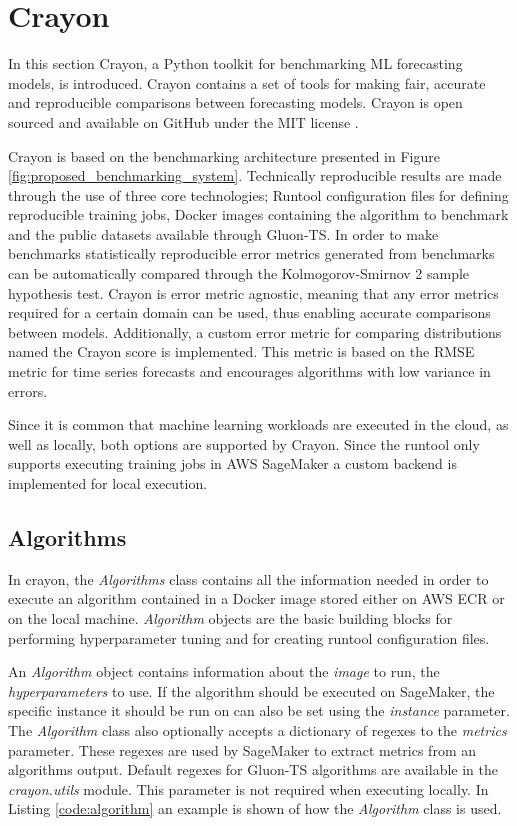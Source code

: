 \chapter{Crayon}
\label{cha:crayon}

In this section Crayon, a Python toolkit for benchmarking ML forecasting models, is introduced. Crayon contains a set of tools for making fair, accurate and reproducible comparisons between forecasting models. Crayon is open sourced and available on GitHub under the MIT license \cite{crayon_github}.

Crayon is based on the benchmarking architecture presented in Figure \ref{fig:proposed_benchmarking_system}. Technically reproducible results are made through the use of three core technologies; Runtool configuration files for defining reproducible training jobs, Docker images containing the algorithm to benchmark and the public datasets available through Gluon-TS. In order to make benchmarks statistically reproducible error metrics generated from benchmarks can be automatically compared through the Kolmogorov-Smirnov 2 sample hypothesis test. Crayon is error metric agnostic, meaning that any error metrics required for a certain domain can be used, thus enabling accurate comparisons between models. Additionally, a custom error metric for comparing distributions named the Crayon score is implemented. This metric is based on the RMSE metric for time series forecasts and encourages algorithms with low variance in errors.

Since it is common that machine learning workloads are executed in the cloud, as well as locally, both options are supported by Crayon. Since the runtool only supports executing training jobs in AWS SageMaker a custom backend is implemented for local execution.

\section{Algorithms}
\label{crayon:algorithms}
In crayon, the \textit{Algorithms} class contains all the information needed in order to execute an algorithm contained in a Docker image stored either on AWS ECR or on the local machine. \textit{Algorithm} objects are the basic building blocks for performing hyperparameter tuning and for creating runtool configuration files.

An \textit{Algorithm} object contains information about the \textit{image} to run, the \textit{hyperparameters} to use. If the algorithm should be executed on SageMaker, the specific instance it should be run on can also be set using the \textit{instance} parameter. The \textit{Algorithm} class also optionally accepts a dictionary of regexes to the \textit{metrics} parameter. These regexes are used by SageMaker to extract metrics from an algorithms output. Default regexes for Gluon-TS algorithms are available in the \textit{crayon.utils} module. This parameter is not required when executing locally. In Listing \ref{code:algorithm} an example is shown of how the \textit{Algorithm} class is used.

